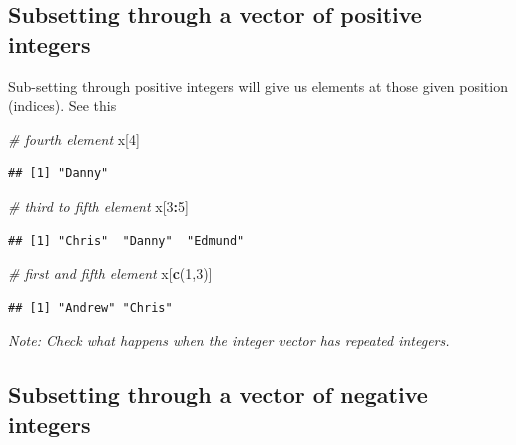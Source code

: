 \documentclass[
]{book}
\newenvironment{Shaded}{\begin{snugshade}}{\end{snugshade}}
\newcommand{\CommentTok}[1]{\textcolor[rgb]{0.56,0.35,0.01}{\textit{#1}}}
\newcommand{\DecValTok}[1]{\textcolor[rgb]{0.00,0.00,0.81}{#1}}
\newcommand{\FunctionTok}[1]{\textcolor[rgb]{0.13,0.29,0.53}{\textbf{#1}}}
\newcommand{\NormalTok}[1]{#1}
\newcommand{\SpecialCharTok}[1]{\textcolor[rgb]{0.81,0.36,0.00}{\textbf{#1}}}
\begin{document}
\hypertarget{subsetting-through-a-vector-of-positive-integers}{%
\subsection{Subsetting through a vector of positive integers}\label{subsetting-through-a-vector-of-positive-integers}}

Sub-setting through positive integers will give us elements at those given position (indices). See this

\begin{Shaded}
\begin{Highlighting}[]
\CommentTok{\# fourth element}
\NormalTok{x[}\DecValTok{4}\NormalTok{]}
\end{Highlighting}
\end{Shaded}

\begin{verbatim}
## [1] "Danny"
\end{verbatim}

\begin{Shaded}
\begin{Highlighting}[]
\CommentTok{\# third to fifth element}
\NormalTok{x[}\DecValTok{3}\SpecialCharTok{:}\DecValTok{5}\NormalTok{]}
\end{Highlighting}
\end{Shaded}

\begin{verbatim}
## [1] "Chris"  "Danny"  "Edmund"
\end{verbatim}

\begin{Shaded}
\begin{Highlighting}[]
\CommentTok{\# first and fifth element}
\NormalTok{x[}\FunctionTok{c}\NormalTok{(}\DecValTok{1}\NormalTok{,}\DecValTok{3}\NormalTok{)]}
\end{Highlighting}
\end{Shaded}

\begin{verbatim}
## [1] "Andrew" "Chris"
\end{verbatim}

\emph{Note: Check what happens when the integer vector has repeated integers.}

\hypertarget{subsetting-through-a-vector-of-negative-integers}{%
\subsection{Subsetting through a vector of negative integers}\label{subsetting-through-a-vector-of-negative-integers}}
\end{document}
